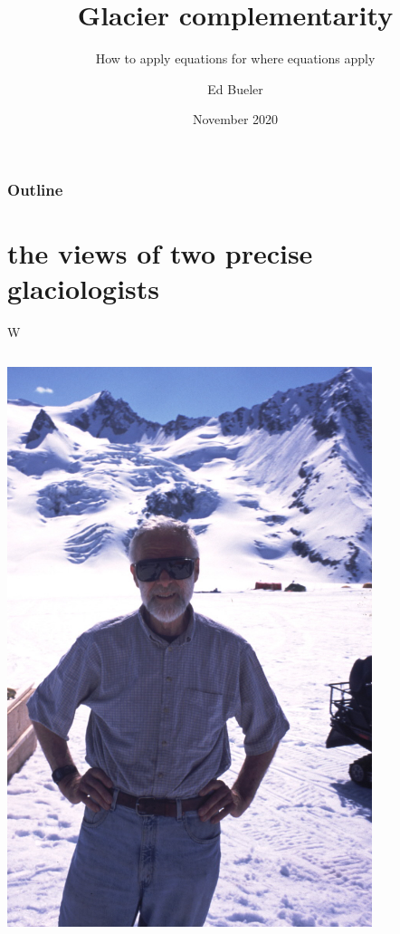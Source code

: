 \documentclass[10pt,hyperref,dvipsnames]{beamer}
\title{Glacier complementarity}
\subtitle{How to apply equations for where equations apply}
\author{Ed Bueler}
\institute[UAF]{University of Alaska Fairbanks}
\date{November 2020}
\begin{document}
\beamertemplatenavigationsymbolsempty

\begin{frame}
  \maketitle
\end{frame}

\begin{frame}
  \frametitle{Outline}
  \tableofcontents[hideallsubsections]
\end{frame}


\section{the views of two precise glaciologists}

\begin{frame}{W}

\begin{columns}
\begin{column}{0.5\textwidth}
\includegraphics[width=0.8\textwidth]{figs/Will-by-Truffer.jpg}


\end{column}
\end{columns}
\end{frame}
\end{document}
